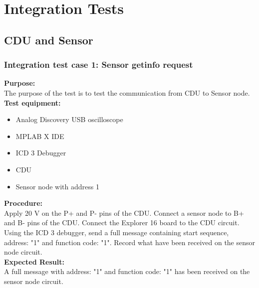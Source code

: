 \chapter{Integration Tests}

\section{CDU and Sensor}
\subsection{Integration test case 1: Sensor getinfo request}
\textbf{Purpose:}\\
The purpose of the test is to test the communication from CDU to Sensor node.\\

\textbf{Test equipment:}
\begin{itemize}
\item Analog Discovery USB oscilloscope
\item MPLAB X IDE
\item ICD 3 Debugger
\item CDU
\item Sensor node with address 1
\end{itemize}

\textbf{Procedure:}\\
Apply 20 V on the P+ and P- pins of the CDU. Connect a sensor node to B+ and B- pins of the CDU. Connect the Explorer 16 board to the CDU circuit. Using the ICD 3 debugger, send a full message containing start sequence, address: "1" and function code: "1". Record what have been received on the sensor node circuit.\\

\textbf{Expected Result:}\\
A full message with address: "1" and function code: "1" has been received on the sensor node circuit.\\

